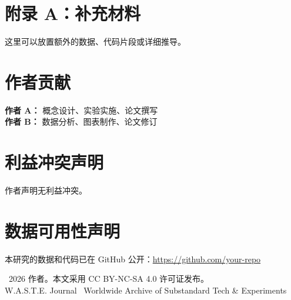 \documentclass[a4paper,12pt]{article}
\begin{document}
\appendix
\section{附录 A：补充材料}

这里可以放置额外的数据、代码片段或详细推导。

\section*{作者贡献}

\textbf{作者 A：} 概念设计、实验实施、论文撰写 \\
\textbf{作者 B：} 数据分析、图表制作、论文修订

\section*{利益冲突声明}

作者声明无利益冲突。

\section*{数据可用性声明}

本研究的数据和代码已在 GitHub 公开：\url{https://github.com/your-repo}

\vspace{2cm}
\begin{center}
\small\color{waste-gray}
\textcopyright\ 2026 作者。本文采用 CC BY-NC-SA 4.0 许可证发布。\\
W.A.S.T.E. Journal \textbullet\ Worldwide Archive of Substandard Tech \& Experiments
\end{center}
\end{document}

